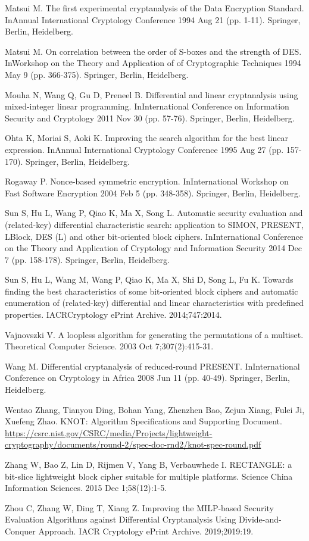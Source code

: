 Matsui M. The first experimental cryptanalysis of the Data Encryption Standard. InAnnual International Cryptology Conference 1994 Aug 21 (pp. 1-11). Springer, Berlin, Heidelberg.

Matsui M. On correlation between the order of S-boxes and the strength of DES. InWorkshop on the Theory and Application of of Cryptographic Techniques 1994 May 9 (pp. 366-375). Springer, Berlin, Heidelberg.

Mouha N, Wang Q, Gu D, Preneel B. Differential and linear cryptanalysis using mixed-integer linear programming. InInternational Conference on Information Security and Cryptology 2011 Nov 30 (pp. 57-76). Springer, Berlin, Heidelberg.

Ohta K, Moriai S, Aoki K. Improving the search algorithm for the best linear expression. InAnnual International Cryptology Conference 1995 Aug 27 (pp. 157-170). Springer, Berlin, Heidelberg.

Rogaway P. Nonce-based symmetric encryption. InInternational Workshop on Fast Software Encryption 2004 Feb 5 (pp. 348-358). Springer, Berlin, Heidelberg.

Sun S, Hu L, Wang P, Qiao K, Ma X, Song L. Automatic security evaluation and (related-key) differential characteristic search: application to SIMON, PRESENT, LBlock, DES (L) and other bit-oriented block ciphers. InInternational Conference on the Theory and Application of Cryptology and Information Security 2014 Dec 7 (pp. 158-178). Springer, Berlin, Heidelberg.

Sun S, Hu L, Wang M, Wang P, Qiao K, Ma X, Shi D, Song L, Fu K. Towards finding the best characteristics of some bit-oriented block ciphers and automatic enumeration of (related-key) differential and linear characteristics with predefined properties. IACRCryptology ePrint Archive. 2014;747:2014.

Vajnovszki V. A loopless algorithm for generating the permutations of a multiset. Theoretical Computer Science. 2003 Oct 7;307(2):415-31.

Wang M. Differential cryptanalysis of reduced-round PRESENT. InInternational Conference on Cryptology in Africa 2008 Jun 11 (pp. 40-49). Springer, Berlin, Heidelberg.

Wentao Zhang, Tianyou Ding, Bohan Yang, Zhenzhen Bao, Zejun Xiang, Fulei Ji, Xuefeng Zhao. KNOT: Algorithm Specifications and Supporting Document. \url{https://csrc.nist.gov/CSRC/media/Projects/lightweight-cryptography/documents/round-2/spec-doc-rnd2/knot-spec-round.pdf}

Zhang W, Bao Z, Lin D, Rijmen V, Yang B, Verbauwhede I. RECTANGLE: a bit-slice lightweight block cipher suitable for multiple platforms. Science China Information Sciences. 2015 Dec 1;58(12):1-5.

Zhou C, Zhang W, Ding T, Xiang Z. Improving the MILP-based Security Evaluation Algorithms against Differential Cryptanalysis Using Divide-and-Conquer Approach. IACR Cryptology ePrint Archive. 2019;2019:19.


